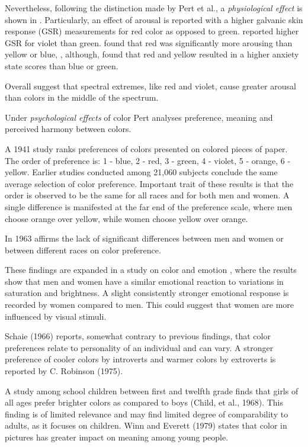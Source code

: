 		Nevertheless, following the distinction made by Pert et al., a \textit{physiological effect} is shown in \cite{Wilson1966}. Particularly, an effect of arousal is reported with a higher galvanic skin response (GSR) measurements for red color as opposed to green. 
		\cite{Nourse1971} reported higher GSR for violet than green.
		\cite{Jacobs1974} found that red was significantly more arousing than yellow or blue, 
		\cite{Jacobs1975}, although, found that red and yellow resulted in a higher anxiety state scores than blue or green.
		
		Overall \cite{Pett1996} suggest that spectral extremes, like red and violet, cause greater arousal than colors in the middle of the spectrum.
		
		Under \textit{psychological effects} of color Pert analyses preference, meaning and perceived harmony between colors.
		
		A 1941 study \cite{Eysenck1941} ranks preferences of colors presented on colored pieces of paper. 
		The order of preference is: 1 - blue, 2 - red, 3 - green, 4 - violet, 5 - orange, 6 - yellow. Earlier studies conducted among 21,060 subjects conclude the same average selection of color preference. Important trait of these results is that the order is observed to be the same for all races and for both men and women. A single difference is manifested at the far end of the preference scale, where men choose orange over yellow, while women choose yellow over orange.
		
		In 1963 \cite{burnham1963color} affirms the lack of significant differences between men and women or between different races on color preference.
		
		These findings are expanded in a study on color and emotion \cite{Valdez1994}, where the results show that men and women have a similar emotional reaction to variations in saturation and brightness. A slight consistently stronger emotional response is recorded by women compared to men. This could suggest that women are more influenced by visual stimuli.
		
		Schaie (1966) reports, somewhat contrary to previous findings, that color preferences relate to personality of an individual and can vary. A stronger preference of cooler colors by introverts and warmer colors by extroverts is reported by C. Robinson (1975).
		
		A study among school children between first and twelfth grade finds that girls of all ages prefer brighter colors as compared to boys (Child, et al., 1968). This finding is of limited relevance and may find limited degree of comparability to adults, as it focuses on children. Winn and Everett (1979) states that color in pictures has greater impact on meaning among young people.
				
